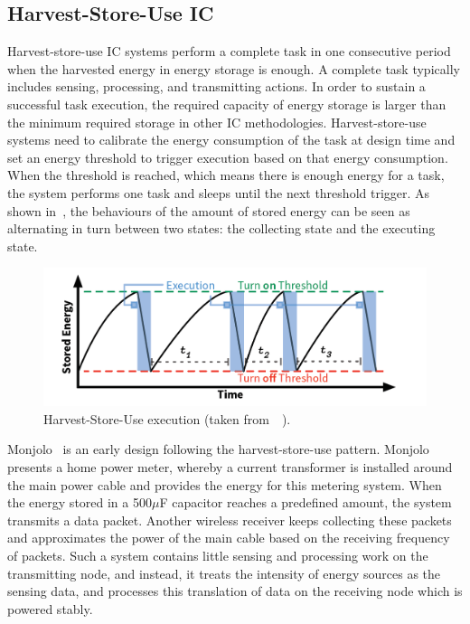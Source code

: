 \subsection{Harvest-Store-Use IC}

Harvest-store-use IC systems perform a complete task in one consecutive period when the harvested energy in energy storage is enough. A complete task typically includes sensing, processing, and transmitting actions. In order to sustain a successful task execution, the required capacity of energy storage is larger than the minimum required storage in other IC methodologies. Harvest-store-use systems need to calibrate the energy consumption of the task at design time and set an energy threshold to trigger execution based on that energy consumption. When the threshold is reached, which means there is enough energy for a task, the system performs one task and sleeps until the next threshold trigger. As shown in~, the behaviours of the amount of stored energy can be seen as alternating in turn between two states: the collecting state and the executing state.

\begin{figure}
    \centering
    \includegraphics[width=\columnwidth]{ch2_review/figures/saveanduse}
    \caption{Harvest-Store-Use execution (taken from~\cite{hester2017future}~).}
    \label{Figure:saveanduse}
\end{figure}

Monjolo~\cite{debruin2013monjolo} is an early design following the harvest-store-use pattern. Monjolo presents a home power meter, whereby a current transformer is installed around the main power cable and provides the energy for this metering system. When the energy stored in a 500$\mu$F capacitor reaches a predefined amount, the system transmits a data packet. Another wireless receiver keeps collecting these packets and approximates the power of the main cable based on the receiving frequency of packets. Such a system contains little sensing and processing work on the transmitting node, and instead, it treats the intensity of energy sources as the sensing data, and processes this translation of data on the receiving node which is powered stably.

